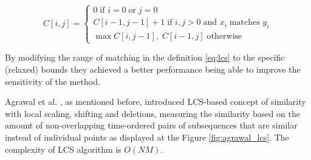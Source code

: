 \begin{equation}
 C[i,j] = 
 \begin{cases} 
  0 \; \text{if } i=0 \; \text{or} \; j=0 \\
  C[i-1,j-1]+1 \; \text{if } i,j>0 \; \text{and } x_{i} \; \text{matches } y_{i} \\
  \max{C[i,j-1], \;C[i-1,j]} \; \text{otherwise}
 \end{cases}
\label{eq:lcs}
\end{equation}

By modifying the range of matching in the definition \ref{eq:lcs} to the specific (relaxed) bounds they achieved a better performance being able to improve the sensitivity of the method. 

Agrawal et al. \cite{citeulike:3816327}, as mentioned before, introduced LCS-based concept of similarity with local scaling, shifting and deletions, measuring the similarity based on the amount of non-overlapping time-ordered pairs of subsequences that are similar instead of individual points as displayed at the Figure \ref{fig:agrawal_lcs}. The complexity of LCS algorithm is $O(NM)$.